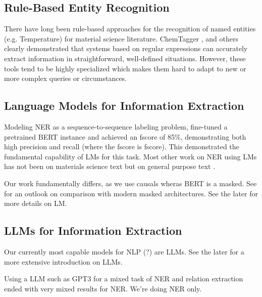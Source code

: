 

\subsection{Rule-Based Entity Recognition}
There have long been rule-based approaches for the recognition of named entities (e.g. Temperature) for material science literature.
ChemTagger \cite{hawizy_chemicaltagger_2011}, and others \cite{beard_comparative_2019, huang_database_2020}
clearly demonstrated that systems based on regular expressions can accurately extract information in straightforward, well-defined situations.
However, these tools tend to be highly specialized which makes them hard to adapt to new or more complex queries or circumstances.


\subsection{Language Models for Information Extraction}
Modeling \gls{NER} as a sequence-to-sequence labeling problem, \cite{zhao_finetuning_2021} fine-tuned a pretrained \gls{BERT} instance and achieved an \gls{fscore} of 85\%, demonstrating both high precision and recall (where the \gls{fscore} is \glsdesc{fscore}).
This demonstrated the fundamental capability of \glspl{LM} for this task.
Most other work on \gls{NER} using \glspl{LM} has not been on materials science text but on general purpose text \cite{li_survey_2022}.

Our work fundamentally differs, as we use \glspl{causal} wheras \gls{BERT} is a \gls{masked}. See  for an outlook on comparison with modern \gls{masked} architectures. See the later  for more details on \acrlong{LM}.

\subsection{LLMs for Information Extraction}
{\color{blue}
Our currently most capable models for \gls{NLP} (?) are \glspl{LLM}. See the later  for a more extensive introduction on \glspl{LLM}. 

Using a \gls{LLM} such as \gls{GPT3} for a mixed task of \gls{NER} and relation extraction ended with very mixed results for \gls{NER}. \cite{dunn_structured_2022}
We're doing \gls{NER} only.
}

